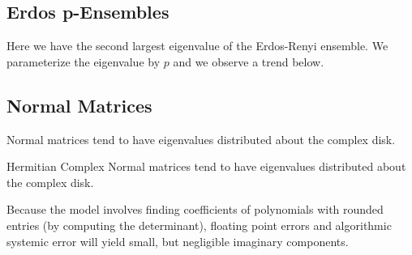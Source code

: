
\subsection{Erdos p-Ensembles}

Here we have the second largest eigenvalue of the Erdos-Renyi ensemble. We parameterize the eigenvalue by $p$ and we observe a trend below.


\newpage
\subsection{Normal Matrices}

Normal matrices tend to have eigenvalues distributed about the complex disk.



Hermitian Complex Normal matrices tend to have eigenvalues distributed about the complex disk.

\begin{remark}
Because the model involves finding coefficients of polynomials with rounded entries (by computing the determinant), floating point errors and algorithmic systemic error will yield small, but negligible imaginary components.
\end{remark}

